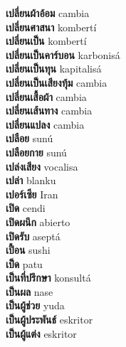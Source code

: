 \textbf{ เปลี่ยนผ้าอ้อม  } cambia \\
\textbf{ เปลี่ยนศาสนา  } kombertí \\
\textbf{ เปลี่ยนเป็น  } kombertí \\
\textbf{ เปลี่ยนเป็นคาร์บอน  } karbonisá \\
\textbf{ เปลี่ยนเป็นทุน  } kapitalisá \\
\textbf{ เปลี่ยนเป็นเสียงทุ้ม  } cambia \\
\textbf{ เปลี่ยนเสื้อผ้า  } cambia \\
\textbf{ เปลี่ยนเส้นทาง  } cambia \\
\textbf{ เปลี่ยนแปลง  } cambia \\
\textbf{ เปลือย  } sunú \\
\textbf{ เปลือยกาย  } sunú \\
\textbf{ เปล่งเสียง  } vocalisa \\
\textbf{ เปล่า  } blanku \\
\textbf{ เปอร์เซีย  } Iran \\
\textbf{ เปิด  } cendi \\
\textbf{ เปิดผนึก  } abierto \\
\textbf{ เปิดรับ  } aseptá \\
\textbf{ เปื้อน  } sushi \\
\textbf{ เป็ด  } patu \\
\textbf{ เป็นที่ปรึกษา  } konsultá \\
\textbf{ เป็นผล  } nase \\
\textbf{ เป็นผู้ช่วย  } yuda \\
\textbf{ เป็นผู้ประพันธ์  } eskritor \\
\textbf{ เป็นผู้แต่ง  } eskritor \\
